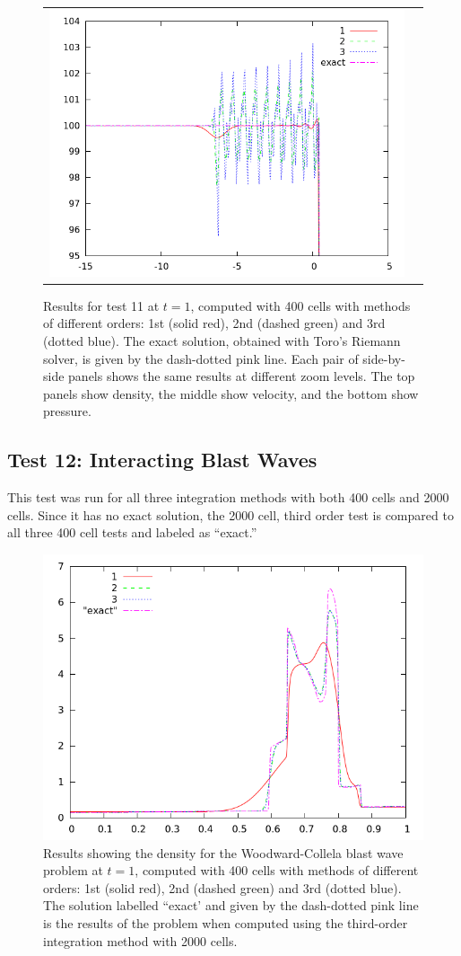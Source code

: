 \documentclass[10pt]{article}
\begin{document}
\begin{figure}[h]
\begin{center}
\begin{tabular}{cc}
      \includegraphics[width=.4\textwidth]{prs11zoom.png} \\
	\end{tabular}	
  \end{center}
  \caption{Results for test 11 at $t=1$, computed with 400 cells with methods of different orders: 1st (solid red), 2nd (dashed green) and 3rd (dotted blue). The exact solution, obtained with Toro's Riemann solver, is given by the dash-dotted pink line. Each pair of side-by-side panels shows the same results at different zoom levels. The top panels show density, the middle show velocity, and the bottom show pressure.}
\end{figure}

\clearpage

\subsection{Test 12: Interacting Blast Waves}
This test was run for all three integration methods with both 400 cells and 2000 cells. Since it has no exact solution, the 2000 cell, third order test is compared to all three 400 cell tests and labeled as ``exact.''

\begin{figure}[h]
  \begin{center}
     \includegraphics[width=.78\textwidth]{den_T12_400.png}	
  \end{center}
  \caption{Results showing the density for the Woodward-Collela blast wave problem at $t=1$, computed with 400 cells with methods of different orders: 1st (solid red), 2nd (dashed green) and 3rd (dotted blue). The solution labelled ``exact' and given by the dash-dotted pink line is the results of the problem when computed using the third-order integration method with 2000 cells.}
  \label{fig:den_T12_400}
\end{figure}
\end{document}
